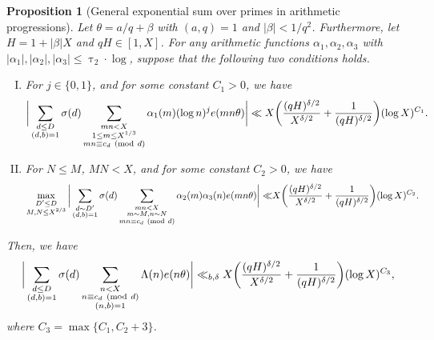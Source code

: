 \documentclass[12pt]{amsart}
\numberwithin{equation}{section}
\newtheorem{prop}[theorem]{Proposition}
\theoremstyle{remark}
\theoremstyle{definition}
\newcommand{\imod}[1]{\ (\mathrm{mod}\ #1)}
\begin{document}
\begin{prop}[General exponential sum over primes in arithmetic progressions]
Let $\theta =a/q+\beta$ with $(a, q)=1$ and $|\beta|<1/q^2$. Furthermore, let $H=1+|\beta|X$ and $qH\in [1, X]$. For any arithmetic functions $\alpha_1, \alpha_2, \alpha_3$ with $|\alpha_1|, |\alpha_2|, |\alpha_3|\leq \uptau_2\cdot \log$, suppose that the following two conditions holds.
\begin{enumerate}[(I)]
\item \label{TypeI} For $j\in \{0,1\}$, and for some constant $C_1>0$, we have
\begin{align}\notag 
\bigg|\sum_{\substack{d\leq D\\(d, b)=1}}{\sigma}(d)\sum_{\substack{mn<X\\ 1\leq m\leq X^{1/3}\\mn\equiv c_d\imod d}}{\alpha}_1(m)(\log n)^je(mn\theta)\bigg| \ll X\bigg(\dfrac{(qH)^{\delta/2}}{X^{\delta/2}} + \dfrac{1}{(qH)^{\delta/2}}\bigg)(\log X)^{C_1}.
\end{align}
\item \label{Type II} For $N\leq M$, $MN<X$, and for some constant $C_2>0$, we have
\begin{align}\notag 
\max_{\substack{D'\leq D\\ M, N\leq X^{2/3}}}\bigg|\sum_{\substack{d\sim D'\\(d, b)=1}}{\sigma}(d)\sum_{\substack{mn<X\\ m\sim M, n\sim N \\mn\equiv c_d\imod d}}{\alpha}_2(m){\alpha}_3(n)e(mn\theta)\bigg| \ll & X\bigg(\dfrac{(qH)^{\delta/2}}{X^{\delta/2}} + \dfrac{1}{(qH)^{\delta/2}}\bigg)(\log X)^{C_2}.
\end{align}
\end{enumerate}
Then, we have
\begin{align}\notag 
\bigg|\sum_{\substack{d\leq D\\(d, b)=1}}{\sigma}(d)\sum_{\substack{n<X\\n\equiv c_d\imod d\\(n, b)=1}}\Lambda(n)e(n\theta)\bigg| \ll_{b, \delta} X\bigg(\dfrac{(qH)^{\delta/2}}{X^{\delta/2}} + \dfrac{1}{(qH)^{\delta/2}}\bigg)(\log X)^{C_3},
\end{align}
where $C_3=\max\{C_1, C_2+3\}$.
\end{prop}
\end{document}
